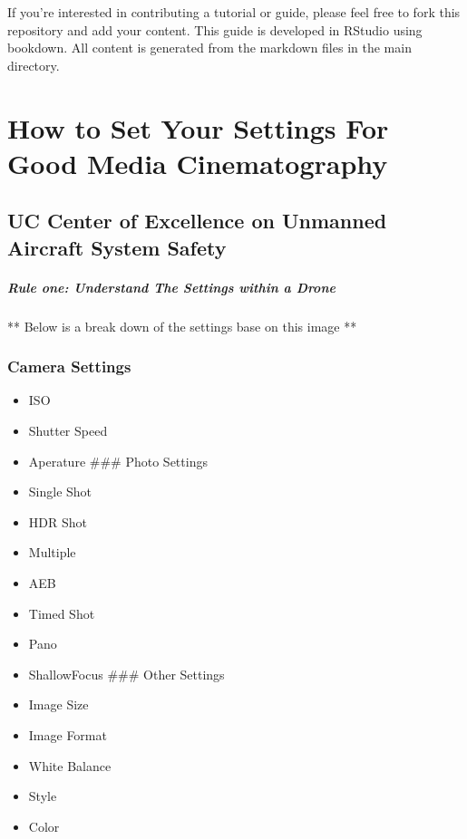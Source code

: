 \documentclass[
]{book}
\providecommand{\tightlist}{%
  \setlength{\itemsep}{0pt}\setlength{\parskip}{0pt}}
\begin{document}
If you're interested in contributing a tutorial or guide, please feel free to fork this repository and add your content. This guide is developed in RStudio using bookdown. All content is generated from the markdown files in the main directory.

\hypertarget{ch-camera-settings}{%
\chapter{How to Set Your Settings For Good Media Cinematography}\label{ch-camera-settings}}

\hypertarget{uc-center-of-excellence-on-unmanned-aircraft-system-safety}{%
\section{UC Center of Excellence on Unmanned Aircraft System Safety}\label{uc-center-of-excellence-on-unmanned-aircraft-system-safety}}

\hypertarget{rule-one-understand-the-settings-within-a-drone}{%
\paragraph{Rule one: Understand The Settings within a Drone}\label{rule-one-understand-the-settings-within-a-drone}}

** Below is a break down of the settings base on this image **

\hypertarget{camera-settings}{%
\subsection{Camera Settings}\label{camera-settings}}

\begin{itemize}
\tightlist
\item
  ISO
\item
  Shutter Speed
\item
  Aperature
  \#\#\# Photo Settings
\item
  Single Shot
\item
  HDR Shot
\item
  Multiple
\item
  AEB
\item
  Timed Shot
\item
  Pano
\item
  ShallowFocus
  \#\#\# Other Settings
\item
  Image Size
\item
  Image Format
\item
  White Balance
\item
  Style
\item
  Color
\end{itemize}
\end{document}
